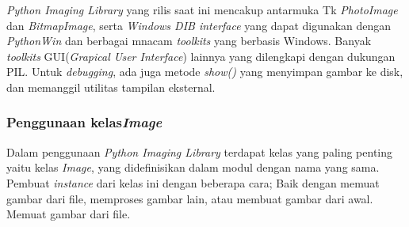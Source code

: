 \textit{Python Imaging Library} yang rilis saat ini mencakup antarmuka Tk \textit{PhotoImage} dan \textit{BitmapImage}, serta \textit{Windows DIB interface} yang dapat digunakan dengan \textit{PythonWin} dan berbagai mnacam \textit{toolkits} yang berbasis Windows. Banyak \textit{toolkits} GUI(\textit{Grapical User Interface}) lainnya yang dilengkapi dengan dukungan PIL. Untuk \textit{debugging}, ada juga metode \textit{show()} yang menyimpan gambar ke disk, dan memanggil utilitas tampilan eksternal.

\subsubsection{Penggunaan kelas\textit{Image}}
Dalam penggunaan \textit{Python Imaging Library} terdapat kelas yang paling penting yaitu kelas \textit{Image}, yang didefinisikan dalam modul dengan nama yang sama. Pembuat \textit{instance} dari kelas ini dengan beberapa cara; Baik dengan memuat gambar dari file, memproses gambar lain, atau membuat gambar dari awal. Memuat gambar dari file. 

